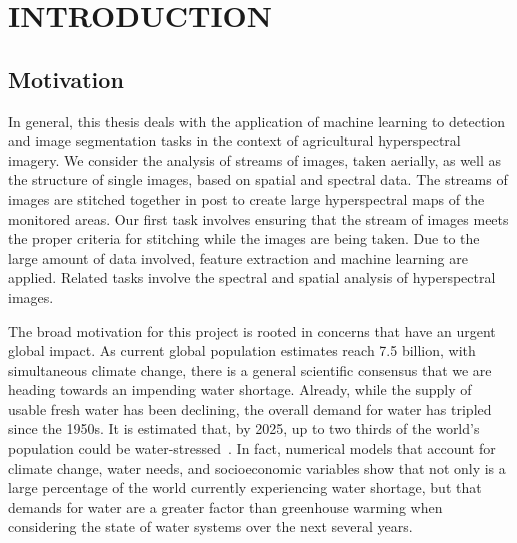 %
%
%



\pagestyle{plain} %
\setcounter{page}{1}


\chapter{\uppercase {Introduction}}

\section{Motivation}

In general, this thesis deals with the application of machine learning to detection and image segmentation tasks in the context of agricultural hyperspectral imagery.
We consider the analysis of streams of images, taken aerially, as well as the structure of single images, based on spatial and spectral data.
The streams of images are stitched together in post to create large hyperspectral maps of the monitored areas.
Our first task involves ensuring that the stream of images meets the proper criteria for stitching while the images are being taken.
Due to the large amount of data involved, feature extraction and machine learning are applied.
Related tasks involve the spectral and spatial analysis of hyperspectral images.

The broad motivation for this project is rooted in concerns that have an urgent global impact.
As current global population estimates reach 7.5 billion, with simultaneous climate change, there is a general scientific consensus that we are heading towards an impending water shortage.
Already, while the supply of usable fresh water has been declining, the overall demand for water has tripled since the 1950s.
It is estimated that, by 2025, up to two thirds of the world's population could be water-stressed~\cite{waterresources}.
In fact, numerical models that account for climate change, water needs, and socioeconomic variables show that not only is a large percentage of the world currently experiencing water shortage, but that demands for water are a greater factor than greenhouse warming when considering the state of water systems over the next several years.

